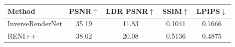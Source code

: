 \begin{tabular}{l|cccc}
\hline
Method & PSNR$\uparrow$ & LDR PSNR$\uparrow$ & SSIM$\uparrow$ & LPIPS$\downarrow$ \\
\hline
InverseRenderNet & 35.19 & 11.83 & 0.1041 & 0.7666 \\
RENI++ & 38.62 & 20.08 & 0.5136 & 0.4875 \\
\hline
\end{tabular}